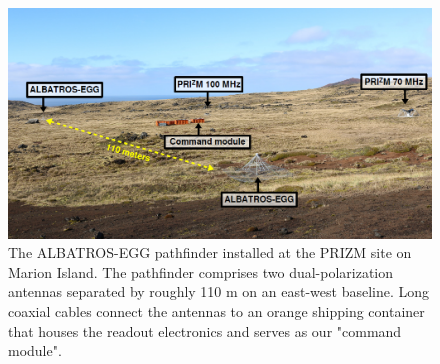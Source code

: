 \documentclass[12pt,a4paper]{report}
\begin{document}
		\begin{figure}[!ht]
			\begin{center}
				\includegraphics[width=1\linewidth]{Figures/ALBATROS-EGG.PNG}
				\caption{The ALBATROS-EGG pathfinder installed at the PRIZM site on Marion Island. The pathfinder comprises two 	dual-polarization antennas separated by roughly 110 m on an	east-west baseline. Long coaxial cables connect the antennas to	an orange shipping container that houses the readout electronics and serves as our "command module".}
				\label{Fig:ALBATROS-EGG}
			\end{center}
		\end{figure}
			
\end{document}
